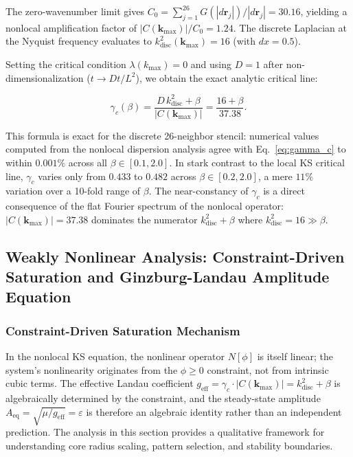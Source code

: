 \documentclass[sn-nature,pdflatex]{sn-jnl}
\begin{document}
The zero-wavenumber limit gives $C_0 = \sum_{j=1}^{26} G(|d\mathbf{r}_j|)/|d\mathbf{r}_j| = 30.16$, yielding a nonlocal amplification factor of $|C(\mathbf{k}_{\max})|/C_0 = 1.24$.
The discrete Laplacian at the Nyquist frequency evaluates to $k^2_{\text{disc}}(\mathbf{k}_{\max}) = 16$ (with $dx = 0.5$).

Setting the critical condition $\lambda(k_{\max}) = 0$ and using $D = 1$ after non-dimensionalization ($t \to D t / L^2$), we obtain the exact analytic critical line:

\begin{equation}
\label{eq:gamma_c}
\gamma_c(\beta) = \frac{D\,k^2_{\text{disc}} + \beta}{|C(\mathbf{k}_{\max})|} = \frac{16 + \beta}{37.38}.
\end{equation}

This formula is exact for the discrete 26-neighbor stencil: numerical values computed from the nonlocal dispersion analysis agree with Eq.~\eqref{eq:gamma_c} to within $0.001\%$ across all $\beta \in [0.1, 2.0]$.
In stark contrast to the local KS critical line, $\gamma_c$ varies only from $0.433$ to $0.482$ across $\beta \in [0.2, 2.0]$, a mere $11\%$ variation over a 10-fold range of $\beta$.
The near-constancy of $\gamma_c$ is a direct consequence of the flat Fourier spectrum of the nonlocal operator: $|C(\mathbf{k}_{\max})| = 37.38$ dominates the numerator $k^2_{\text{disc}} + \beta$ where $k^2_{\text{disc}} = 16 \gg \beta$.

\subsection{Weakly Nonlinear Analysis: Constraint-Driven Saturation and Ginzburg-Landau Amplitude Equation}
\label{sec:amplitude}

\subsubsection{Constraint-Driven Saturation Mechanism}

In the nonlocal KS equation, the nonlinear operator $N[\phi]$ is itself linear; the system's nonlinearity originates from the $\phi \ge 0$ constraint, not from intrinsic cubic terms. The effective Landau coefficient $g_{\text{eff}} = \gamma_c \cdot |C(\mathbf{k}_{\max})| = k^2_{\text{disc}} + \beta$ is algebraically determined by the constraint, and the steady-state amplitude $A_{\text{eq}} = \sqrt{\mu/g_{\text{eff}}} = \varepsilon$ is therefore an algebraic identity rather than an independent prediction. The analysis in this section provides a qualitative framework for understanding core radius scaling, pattern selection, and stability boundaries.
\end{document}

